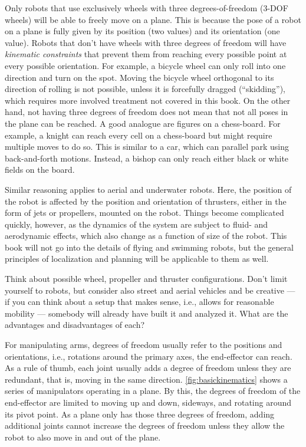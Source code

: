 Only robots that use exclusively wheels with three degrees-of-freedom (3-DOF wheels) will be able to freely move on a plane. This is because the pose of a robot on a plane is fully given by its position (two values) and its orientation (one value). Robots that don't have wheels with three degrees of freedom will have \emph{kinematic constraints} that prevent them from reaching every possible point at every possible orientation. For example, a bicycle wheel can only roll into one direction and turn on the spot. Moving the bicycle wheel orthogonal to its direction of rolling is not possible, unless it is forcefully dragged (``skidding''), which requires more involved treatment not covered in this book. On the other hand, not having three degrees of freedom does not mean that not all poses in the plane can be reached.
A good analogue are figures on a chess-board. For example, a knight can reach every cell on a chess-board but might require multiple moves to do so. This is similar to a car, which can parallel park using back-and-forth motions. Instead, a bishop can only reach either black or white fields on the board.

Similar reasoning applies to aerial and underwater robots. Here, the position of the robot is affected by the position and orientation of thrusters, either in the form of jets or propellers, mounted on the robot. Things become complicated quickly, however, as the dynamics of the system are subject to fluid- and aerodynamic effects, which also change as a function of size of the robot. This book will not go into the details of flying and swimming robots, but the general principles of localization and planning will be applicable to them as well.

\begin{framed}Think about possible wheel, propeller and thruster configurations. Don't limit yourself to robots, but consider also street and aerial vehicles and be creative --- if you can think about a setup that makes sense, i.e., allows for reasonable mobility --- somebody will already have built it and analyzed it. What are the advantages and disadvantages of each?
\end{framed}

For manipulating arms, degrees of freedom usually refer to the positions and orientations, i.e., rotations around the primary axes, the end-effector can reach. As a rule of thumb, each joint usually adds a degree of freedom unless they are redundant, that is, moving in the same direction. \cref{fig:basickinematics} shows a series of manipulators operating in a plane. By this, the degrees of freedom of the end-effector are limited to moving up and down, sideways, and rotating around its pivot point. As a plane only has those three degrees of freedom, adding additional joints cannot increase the degrees of freedom unless they allow the robot to also move in and out of the plane.

